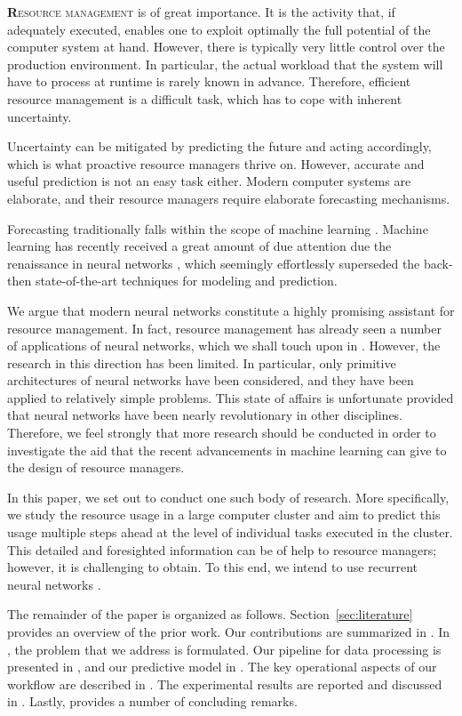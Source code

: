 \lettrine[findent=0.2em, nindent=0em]{\textbf{R}}{esource management} is of
great importance. It is the activity that, if adequately executed, enables one
to exploit optimally the full potential of the computer system at hand. However,
there is typically very little control over the production environment. In
particular, the actual workload that the system will have to process at runtime
is rarely known in advance. Therefore, efficient resource management is a
difficult task, which has to cope with inherent uncertainty.

Uncertainty can be mitigated by predicting the future and acting accordingly,
which is what proactive resource managers thrive on. However, accurate and
useful prediction is not an easy task either. Modern computer systems are
elaborate, and their resource managers require elaborate forecasting mechanisms.

Forecasting traditionally falls within the scope of machine learning
\cite{hastie2009}. Machine learning has recently received a great amount of due
attention due the renaissance in neural networks \cite{goodfellow2016}, which
seemingly effortlessly superseded the back-then state-of-the-art techniques for
modeling and prediction.

We argue that modern neural networks constitute a highly promising assistant for
resource management. In fact, resource management has already seen a number of
applications of neural networks, which we shall touch upon in .
However, the research in this direction has been limited. In particular, only
primitive architectures of neural networks have been considered, and they have
been applied to relatively simple problems. This state of affairs is unfortunate
provided that neural networks have been nearly revolutionary in other
disciplines. Therefore, we feel strongly that more research should be conducted
in order to investigate the aid that the recent advancements in machine learning
can give to the design of resource managers.

In this paper, we set out to conduct one such body of research. More
specifically, we study the resource usage in a large computer cluster and aim to
predict this usage multiple steps ahead at the level of individual tasks
executed in the cluster. This detailed and foresighted information can be of
help to resource managers; however, it is challenging to obtain. To this end, we
intend to use recurrent neural networks \cite{goodfellow2016}.

The remainder of the paper is organized as follows. Section~\ref{sec:literature}
provides an overview of the prior work. Our contributions are summarized in
. In , the problem that we address is
formulated. Our pipeline for data processing is presented in , and
our predictive model in . The key operational aspects of our
workflow are described in . The experimental results are reported
and discussed in . Lastly,  provides a number of
concluding remarks.
